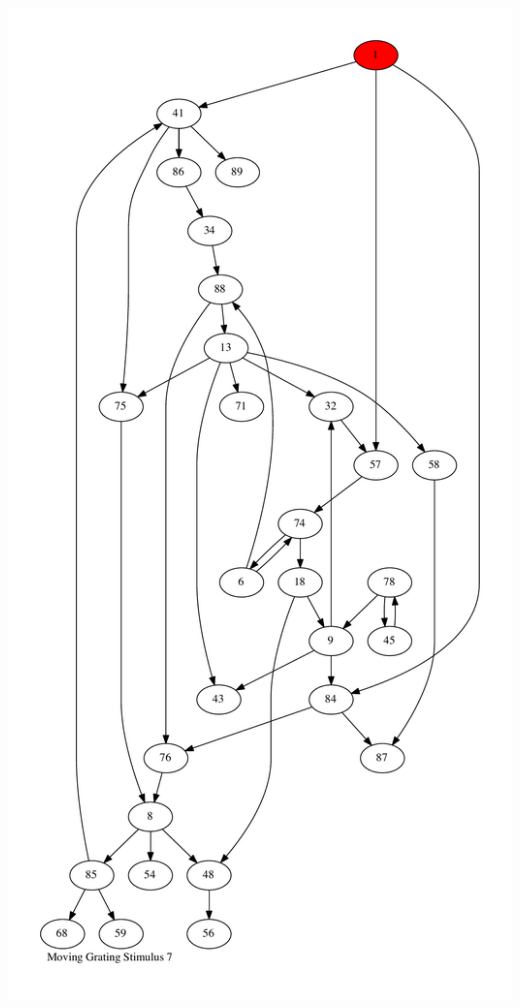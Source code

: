 \documentclass{article}
\begin{document}
\newpage
\includegraphics[max height=\textheight,max width=\textwidth]{stim_mov_grat/stim7_pp.pdf}
\end{document}
